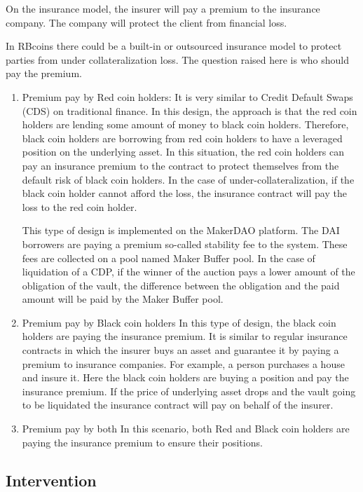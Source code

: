 On the insurance model, the insurer will pay a premium to the insurance company. The company will protect the client from financial loss. 

In RBcoins there could be a built-in or outsourced insurance model to protect parties from under collateralization loss. The question raised here is who should pay the premium.

\begin{enumerate}
	\item Premium pay by Red coin holders:
It is very similar to Credit Default Swaps (CDS) on traditional finance. In this design, the approach is that the red coin holders are lending some amount of money to black coin holders. Therefore, black coin holders are borrowing from red coin holders to have a leveraged position on the underlying asset. In this situation, the red coin holders can pay an insurance premium to the contract to protect themselves from the default risk of black coin holders. In the case of under-collateralization, if the black coin holder cannot afford the loss, the insurance contract will pay the loss to the red coin holder.

This type of design is implemented on the MakerDAO platform. The DAI borrowers are paying a premium so-called stability fee to the system. These fees are collected on a pool named Maker Buffer pool. In the case of liquidation of a CDP, if the winner of the auction pays a lower amount of the obligation of the vault, the difference between the obligation and the paid amount will be paid by the Maker Buffer pool.

	\item Premium pay by Black coin holders
In this type of design, the black coin holders are paying the insurance premium. It is similar to regular insurance contracts in which the insurer buys an asset and guarantee it by paying a premium to insurance companies. For example, a person purchases a house and insure it.
Here the black coin holders are buying a position and pay the insurance premium. If the price of underlying asset drops and the vault going to be liquidated the insurance contract will pay on behalf of the insurer.
	\item Premium pay by both
In this scenario, both Red and Black coin holders are paying the insurance premium to ensure their positions. 
\end{enumerate}
\subsection{Intervention}

